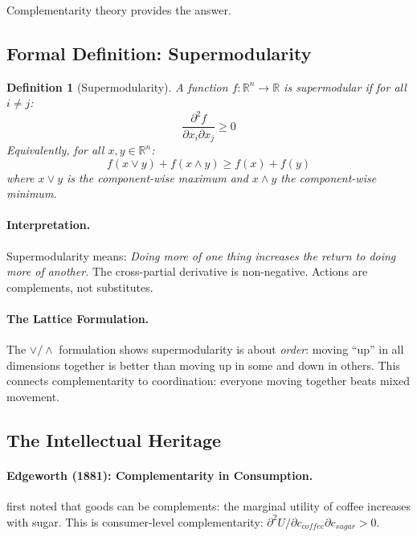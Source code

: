 \documentclass[12pt,a4paper]{article}
\newtheorem{definition}[theorem]{Definition}
\begin{document}
Complementarity theory provides the answer.

\subsection{Formal Definition: Supermodularity}

\begin{definition}[Supermodularity]
A function $f: \mathbb{R}^n \to \mathbb{R}$ is \emph{supermodular} if for all $i \neq j$:
\begin{equation}
  \frac{\partial^2 f}{\partial x_i \partial x_j} \geq 0
  \label{eq:supermodularity}
\end{equation}
Equivalently, for all $x, y \in \mathbb{R}^n$:
\begin{equation}
  f(x \vee y) + f(x \wedge y) \geq f(x) + f(y)
\end{equation}
where $x \vee y$ is the component-wise maximum and $x \wedge y$ the component-wise minimum.
\end{definition}

\paragraph{Interpretation.}
Supermodularity means: \emph{Doing more of one thing increases the return to doing more of another.}
The cross-partial derivative is non-negative.
Actions are complements, not substitutes.

\paragraph{The Lattice Formulation.}
The $\vee / \wedge$ formulation shows supermodularity is about \emph{order}:
moving ``up'' in all dimensions together is better than moving up in some and down in others.
This connects complementarity to coordination: everyone moving together beats mixed movement.

\subsection{The Intellectual Heritage}

\paragraph{Edgeworth (1881): Complementarity in Consumption.}
\citet{edgeworth1881} first noted that goods can be complements:
the marginal utility of coffee increases with sugar.
This is consumer-level complementarity: $\partial^2 U / \partial c_{coffee} \partial c_{sugar} > 0$.
\end{document}
